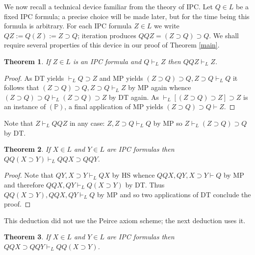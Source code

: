 \documentclass[10pt]{amsart}
\theoremstyle{plain}
\newtheorem{theorem}{Theorem}
\numberwithin{equation}{section}
\begin{document}
\medbreak 

We now recall a technical device familiar from the theory of IPC. Let $Q \in L$ be a fixed IPC formula; a precise choice will be made later, but for the time being this formula is arbitrary. For each IPC formula $Z \in L$ we write $QZ := Q(Z) := Z \supset Q$; iteration produces $QQ Z = (Z \supset Q) \supset Q$. We shall require several properties of this device in our proof of Theorem \ref{main}. 

\begin{theorem} \label{eq}
If $Z \in L$ is an IPC formula and $Q \vdash_L Z$ then $QQ Z \vdash_L Z$. 
\end{theorem} 

\begin{proof} 
As DT yields $\vdash_L Q \supset Z$ and MP yields $(Z \supset Q) \supset Q, Z \supset Q \vdash_L Q$ it follows that $(Z \supset Q) \supset Q, Z \supset Q \vdash_L Z$ by MP again whence $(Z \supset Q) \supset Q  \vdash_L (Z \supset Q) \supset Z$ by DT again. As $\vdash_L [(Z \supset Q) \supset Z] \supset Z$ is an instance of $(\mathbb{P})$, a final application of MP yields $(Z \supset Q) \supset Q \vdash Z$.
\end{proof} 

\medbreak 

Note that $Z \vdash_L QQ Z$ in any case: $Z, Z \supset Q \vdash_L Q$ by MP so $Z \vdash_L (Z \supset Q) \supset Q$ by DT. 

\medbreak 

\begin{theorem} \label{QQ}
If $X \in L$ and $Y \in L$ are IPC formulas then $QQ (X \supset Y) \vdash_L QQ X \supset QQ Y$. 
\end{theorem} 

\begin{proof} 
Note that $QY, X \supset Y \vdash_L QX$ by HS whence $QQX, QY, X \supset Y \vdash Q$ by MP and therefore $QQ X, Q Y \vdash_L Q (X \supset Y)$ by DT. Thus $QQ (X \supset Y), QQX, Q Y \vdash_L Q$ by MP and so two applications of DT conclude the proof. 
\end{proof} 

\medbreak 

This deduction did not use the Peirce axiom scheme; the next deduction uses it. 

\begin{theorem} \label{supset}
If $X \in L$ and $Y \in L$ are IPC formulas then $ QQ X \supset QQ Y \vdash_L QQ (X \supset Y)$. 
\end{theorem} 
\end{document}
